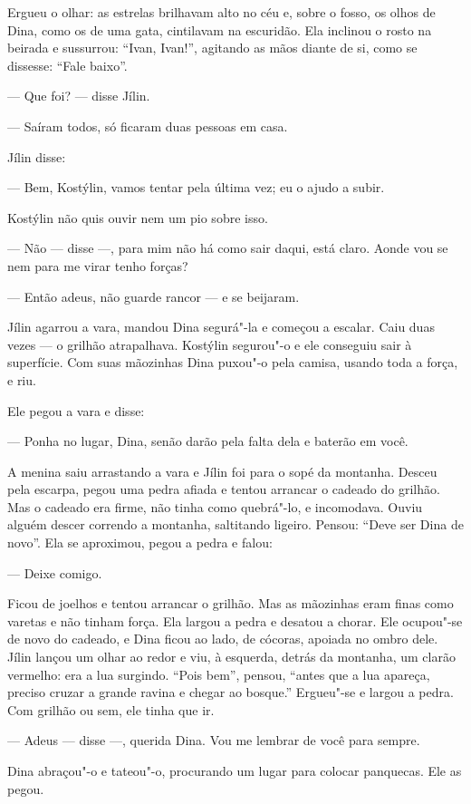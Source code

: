 Ergueu o olhar: as estrelas brilhavam alto no céu e, sobre o fosso,
os olhos de Dina, como os de uma gata, cintilavam na escuridão. Ela
inclinou o rosto na beirada e sussurrou: ``Ivan, Ivan!'', agitando as
mãos diante de si, como se dissesse: ``Fale baixo''.

--- Que foi? --- disse Jílin.

--- Saíram todos, só ficaram duas pessoas em casa.

Jílin disse:

--- Bem, Kostýlin, vamos tentar pela última vez; eu o ajudo a subir.

Kostýlin não quis ouvir nem um pio sobre isso.

--- Não --- disse ---, para mim não há como sair daqui, está claro. Aonde vou se nem para me virar tenho forças?

--- Então adeus, não guarde rancor --- e se beijaram.

Jílin agarrou a vara, mandou Dina segurá"-la e começou a escalar. Caiu
duas vezes --- o grilhão atrapalhava. Kostýlin segurou"-o e ele conseguiu
sair à superfície. Com suas mãozinhas Dina puxou"-o pela camisa, usando toda
a força, e riu.

Ele pegou a vara e disse:

--- Ponha no lugar, Dina, senão darão pela falta dela e baterão em você.

A menina saiu arrastando a vara e Jílin foi para o sopé da montanha. Desceu
pela escarpa, pegou uma pedra afiada e tentou arrancar o cadeado do
grilhão. Mas o cadeado era firme, não tinha como quebrá"-lo, e
incomodava. Ouviu alguém descer correndo a montanha, saltitando ligeiro.
Pensou: ``Deve ser Dina de novo''. Ela se aproximou, pegou a pedra e
falou:

--- Deixe comigo.

Ficou de joelhos e tentou arrancar o grilhão. Mas as mãozinhas eram
finas como varetas e não tinham força. Ela largou a pedra e desatou a
chorar. Ele ocupou"-se de novo do cadeado, e Dina ficou ao lado, de
cócoras, apoiada no ombro dele. Jílin lançou um olhar ao redor e viu, à
esquerda, detrás da montanha, um clarão vermelho: era a lua surgindo.
``Pois bem'', pensou, ``antes que a lua apareça, preciso cruzar a grande
ravina e chegar ao bosque.'' Ergueu"-se e largou a pedra. Com grilhão ou
sem, ele tinha que ir.

--- Adeus --- disse ---, querida Dina. Vou me lembrar de você para
sempre.

Dina abraçou"-o e tateou"-o, procurando um lugar para colocar panquecas.
Ele as pegou.

